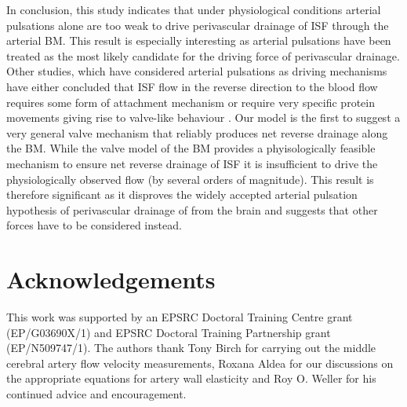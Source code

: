 \documentclass[a4paper,titlepage]{scrartcl}
\begin{document}
In conclusion, this study indicates that under physiological conditions arterial pulsations alone are too weak to drive perivascular drainage of ISF through the arterial BM. This result is especially interesting as arterial pulsations have been treated as the most likely candidate for the driving force of perivascular drainage. Other studies, which have considered arterial pulsations as driving mechanisms have either concluded that ISF flow in the reverse direction to the blood flow requires some form of attachment mechanism \cite{Schley2006,Wang2011} or require very specific protein movements giving rise to valve-like behaviour \cite{Sharp2015}. Our model is the first to suggest a very general valve mechanism that reliably produces net reverse drainage along the BM. While the valve model of the BM provides a phyisologically feasible mechanism to ensure net reverse drainage of ISF it is insufficient to drive the physiologically observed flow (by several orders of magnitude). This result is therefore significant as it disproves the widely accepted arterial pulsation hypothesis of perivascular drainage of \Ab from the brain \cite{Weller2009,Carare2008,Hawkes2011,Morris2014,Schley2006,Attems2011,Wang2011,Iliff2012,Asgari2015,Sharp2015,Weller2015a} and suggests that other forces have to be considered instead.

\section*{Acknowledgements}

This work was supported by an EPSRC Doctoral Training Centre grant (EP/G03690X/1) and EPSRC Doctoral Training Partnership grant (EP/N509747/1). The authors thank Tony Birch for carrying out the middle cerebral artery flow velocity measurements, Roxana Aldea for our discussions on the appropriate equations for artery wall elasticity and Roy O. Weller for his continued advice and encouragement.

%
%
\end{document}

